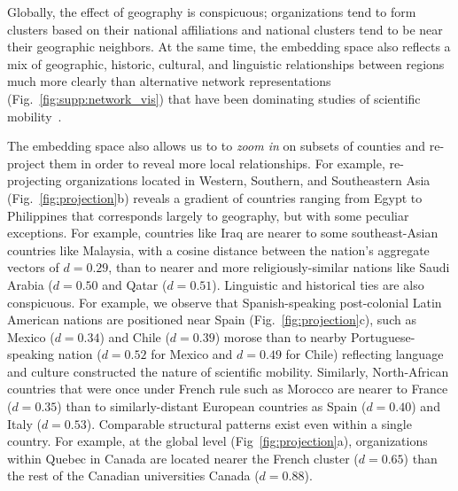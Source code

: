 \documentclass[12pt]{article} %
\begin{document}
Globally, the effect of geography is conspicuous; organizations tend to form clusters based on their national affiliations and national clusters tend to be near their geographic neighbors. 
At the same time, the embedding space also reflects a mix of geographic, historic, cultural, and linguistic relationships between regions much more clearly than alternative network representations (Fig.~\ref{fig:supp:network_vis}) that have been dominating studies of scientific mobility~\autocite{chinchilla2018global, czaika2018globalisation}.

The embedding space also allows us to to \textit{zoom in} on subsets of counties and re-project them in order to reveal more local relationships. 
For example, re-projecting organizations located in Western, Southern, and Southeastern Asia (Fig.~\ref{fig:projection}b) reveals a gradient of countries ranging from Egypt to Philippines that corresponds largely to geography, but with some peculiar exceptions. 
For example, countries like Iraq are nearer to some southeast-Asian countries like Malaysia, with a cosine distance between the nation's aggregate vectors of $d = 0.29$, than to nearer and more religiously-similar nations like Saudi Arabia ($d = 0.50$ and Qatar ($d = 0.51$). 
Linguistic and historical ties are also conspicuous.
For example, we observe that Spanish-speaking post-colonial Latin American nations are positioned near Spain (Fig.~\ref{fig:projection}c), such as Mexico ($d = 0.34$) and Chile ($d = 0.39$) morose than to nearby Portuguese-speaking nation ($d = 0.52$ for Mexico and $d = 0.49$ for Chile) reflecting language and culture constructed the nature of scientific mobility.
Similarly, North-African countries that were once under French rule such as Morocco are nearer to France ($d =0.35$) than to similarly-distant European countries as Spain ($d = 0.40$) and Italy ($d = 0.53$). 
Comparable structural patterns exist even within a single country.
For example, at the global level (Fig~\ref{fig:projection}a), organizations within Quebec in Canada are located nearer the French cluster ($d = 0.65$) than the rest of the Canadian universities Canada ($d = 0.88$).
\end{document}
